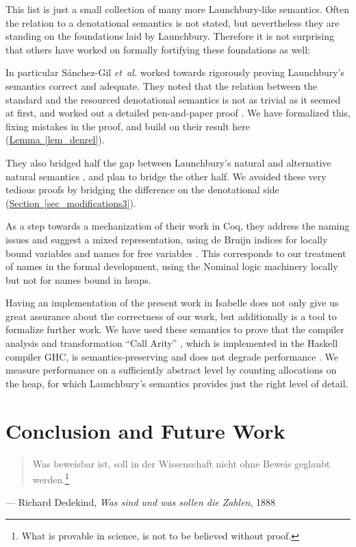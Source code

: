 \documentclass{jfp1}
\newcommand{\myref}[2]{\hyperref[#2]{#1~\ref*{#2}}}
\theoremstyle{nonumberbreak}
\begin{document}
\smallskip

This list is just a small collection of many more Launchbury-like semantics. Often the relation to a denotational semantics is not stated, but nevertheless they are standing on the foundations laid by Launchbury. Therefore it is not surprising that others have worked on formally fortifying these foundations as well:

In particular S{\'a}nchez-Gil {\em et~al.} worked towards rigorously proving Launchbury's semantics correct and adequate. They noted that the relation between the standard and the resourced denotational semantics is not as trivial as it seemed at first, and worked out a detailed pen-and-paper proof . We have formalized this, fixing mistakes in the proof, and build on their result here (\myref{Lemma}{lem_denrel}).

They also bridged half the gap between Launchbury's natural and alternative natural semantics \cite{indirections}, and plan to bridge the other half. We avoided these very tedious proofs by bridging the difference on the denotational side (\myref{Section}{sec_modifications3}).

As a step towards a mechanization of their work in Coq, they address the naming issues and suggest a mixed representation, using de Bruijn indices for locally bound variables and names for free variables . This corresponds to our treatment of names in the formal development, using the Nominal logic machinery \cite{nominal} locally but not for names bound in heaps.

\smallskip

Having an implementation of the present work in Isabelle does not only give us great assurance about the correctness of our work, but additionally is a tool to formalize further work. We have used these semantics to prove that the compiler analysis and transformation ``Call Arity'' \cite{tfp}, which is implemented in the Haskell compiler GHC, is semantics-preserving and does not degrade performance \cite{arity-afp}. We measure performance on a sufficiently abstract level by counting allocations on the heap, for which Launchbury’s semantics provides just the right level of detail.


\section{Conclusion and Future Work}

\begin{quote}
Was beweisbar ist, soll in der Wissenschaft nicht ohne Beweis geglaubt werden.\footnote{
What is provable in science, is not to be believed without proof.}
\end{quote}
\begin{qtsource}
--- Richard Dedekind, \textit{Was sind und was sollen die Zahlen}, 1888
\end{qtsource}
\smallskip
\end{document}
